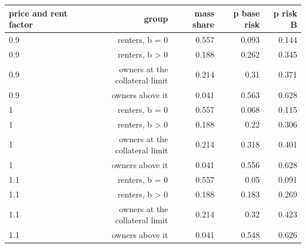 \begin{tabular}{lrrrr}
\toprule
price and rent factor & group & mass share & p base risk & p risk B \\
\midrule
0.9 & renters, b = 0 & 0.557 & 0.093 & 0.144 \\
0.9 & renters, b > 0 & 0.188 & 0.262 & 0.345 \\
0.9 & owners at the collateral limit & 0.214 & 0.31 & 0.371 \\
0.9 & owners above it & 0.041 & 0.563 & 0.628 \\
1 & renters, b = 0 & 0.557 & 0.068 & 0.115 \\
1 & renters, b > 0 & 0.188 & 0.22 & 0.306 \\
1 & owners at the collateral limit & 0.214 & 0.318 & 0.401 \\
1 & owners above it & 0.041 & 0.556 & 0.628 \\
1.1 & renters, b = 0 & 0.557 & 0.05 & 0.091 \\
1.1 & renters, b > 0 & 0.188 & 0.183 & 0.269 \\
1.1 & owners at the collateral limit & 0.214 & 0.32 & 0.423 \\
1.1 & owners above it & 0.041 & 0.548 & 0.626 \\
\bottomrule
\end{tabular}
